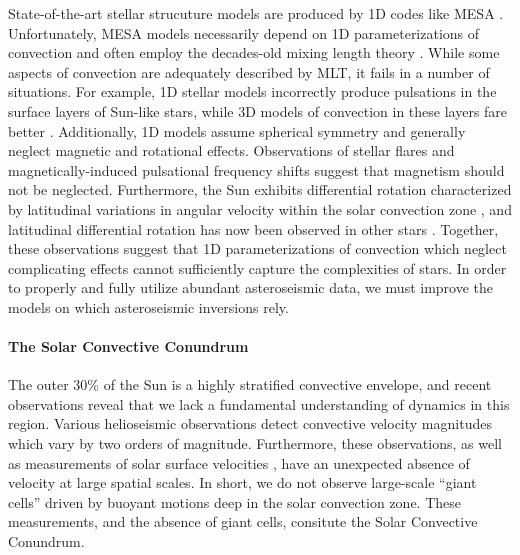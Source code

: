 \documentclass[11pt, preprint]{aastex}
\begin{document}
State-of-the-art stellar strucuture models are produced by 1D codes like MESA \citep{paxton&all2011}.
Unfortunately, MESA models necessarily depend on 1D parameterizations of convection and often employ the decades-old mixing length theory \citep[MLT,][]{bohm-vitense1958}.
While some aspects of convection are adequately described by MLT, it fails in a number of situations.
For example, 1D stellar models incorrectly produce pulsations in the surface layers of Sun-like stars, while 3D models of convection in these layers fare better \citep{jorgensen&weiss2019}.
Additionally, 1D models assume spherical symmetry and generally neglect magnetic and rotational effects.
Observations of stellar flares \citep{kowalski2016} and magnetically-induced pulsational frequency shifts \citep{santos&all2018} suggest that magnetism should not be neglected.
Furthermore, the Sun exhibits differential rotation characterized by latitudinal variations in angular velocity within the solar convection zone \citep{thompson&all1996, schou&all1998}, and latitudinal differential rotation has now been observed in other stars \citep{benomar&all2018}.
Together, these observations suggest that 1D parameterizations of convection which neglect complicating effects cannot sufficiently capture the complexities of stars.
In order to properly and fully utilize abundant asteroseismic data, we must improve the models on which asteroseismic inversions rely.

\vspace{-0.5cm}
\paragraph{The Solar Convective Conundrum}
\label{sct:convective_conundrum}
The outer 30\% of the Sun is a highly stratified convective envelope, and recent observations reveal that we lack a fundamental understanding of dynamics in this region.
Various helioseismic observations \citep{hanasoge&all2012, greer&all2015} detect convective velocity magnitudes which vary by two orders of magnitude.
Furthermore, these observations, as well as measurements of solar surface velocities \citep{hathaway&all2015}, have an unexpected absence of velocity at large spatial scales.
In short, we do not observe large-scale ``giant cells'' driven by buoyant motions deep in the solar convection zone.
These measurements, and the absence of giant cells, consitute the Solar Convective Conundrum.
\end{document}
